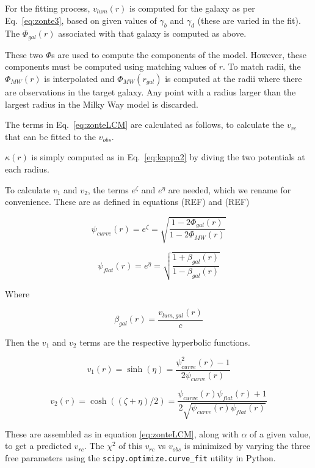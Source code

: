 \documentclass[reprint,%
 amsmath,amssymb,
 aps,
]{revtex4-1}
\begin{document}
For the fitting process, $v_{lum}(r)$ is computed for the galaxy as per Eq.~\ref{eq:zonte3}, based on given values of $\gamma_b$ and $\gamma_d$ (these are varied in the fit). The $\Phi_{gal}(r)$ associated with that galaxy is computed as above.

These two $\Phi$s are used to compute the components of the model. However, these components must be computed using matching values of $r$. To match radii, the $\Phi_{MW}(r)$ is interpolated and $\Phi_{MW}(r_{gal})$ is computed at the radii where there are observations in the target galaxy. Any point with a radius larger than the largest radius in the Milky Way model is discarded.

The terms in Eq.~\ref{eq:zonteLCM} are calculated as follows, to calculate the  $v_{rc}$ that can be fitted to the   $v_{obs}$. 

$\kappa(r)$ is simply computed as in Eq.~\ref{eq:kappa2} by diving the two potentials at each radius.

To calculate $v_1$ and $v_2$,   the terms $e^\zeta$ and $e^\eta$ are needed, which we rename for convenience. These are as defined in equations (REF) and (REF)

\begin{equation}
    \psi_{curve}(r) = e^\zeta = \sqrt{\frac{1 - 2\Phi_{gal}(r)}{1 - 2\Phi_{MW}(r)}}
\end{equation}

\begin{equation}
    \psi_{flat}(r) = e^\eta = \sqrt{\frac{1 + \beta_{gal}(r)}{1 - \beta_{gal}(r)}}
\end{equation}

Where

\begin{equation}
    \beta_{gal}(r) = \frac{v_{lum,gal}(r)}{c}
\end{equation}

Then the $v_1$ and $v_2$ terms are the respective hyperbolic functions.

\begin{equation}
    v_1(r) = \sinh(\eta) = \frac{\psi_{curve}^2(r) - 1}{2 \psi_{curve}(r)}
\end{equation}

\begin{equation}
    v_2(r) = \cosh((\zeta + \eta)/2) = \frac{\psi_{curve}(r) \psi_{flat}(r) + 1}{
    2\sqrt{\psi_{curve}(r) \psi_{flat}(r)}}
\end{equation}

These are assembled as in equation \ref{eq:zonteLCM}, along with $\alpha$ of a given value, to get a predicted $v_{rc}$. The $\chi^2$ of this $v_{rc}$ vs $v_{obs}$ is minimized by varying the three free parameters using the {\tt scipy.optimize.curve\_fit} utility in Python.
\end{document}
